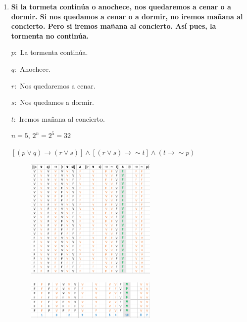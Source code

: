 \documentclass[12pt]{article}
\begin{document}
\begin{enumerate}
                \newpage
                \item \textbf{Si la tormeta continúa o anochece, nos quedaremos a cenar o a dormir. Si nos quedamos a cenar o a dormir, no iremos mañana al concierto. Pero si iremos mañana al concierto. Así pues, la tormenta no continúa.}
                \par$p:$ La tormenta continúa.
                \par$q:$ Anochece.
                \par$r:$ Nos quedaremos a cenar.
                \par$s:$ Nos quedamos a dormir.
                \par$t:$ Iremos mañana al concierto.
                \par$n = 5$, $2^n = 2^5 = 32$
                \par\vspace{0.5cm}$[(p \vee q) \longrightarrow (r \vee s)] \wedge [(r \vee s) \longrightarrow \sim t] \wedge (t \longrightarrow \sim p)$
            
                \begin{figure}[!h]
                    \centering
                    \includegraphics[width=0.6\textwidth]{Img/Tarea4_ej2_1.png}
                \end{figure}

                \begin{figure}[!h]
                    \centering
                    \includegraphics[width=0.6\textwidth]{Img/Tarea4_ej2_2.png}
                \end{figure}


\end{enumerate}
\end{document}
